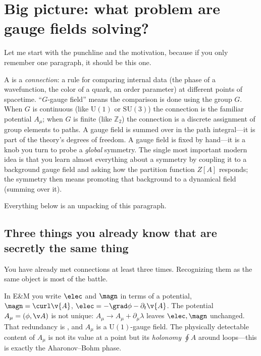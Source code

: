 \documentclass[11pt]{article}
\newcommand{\Uone}{\mathrm{U}(1)}
\newcommand{\Ztwo}{\mathbb{Z}_2}
\begin{document}
\section{Big picture: what problem are gauge fields solving?}

Let me start with the punchline and the motivation, because if you only remember one
paragraph, it should be this one.

\begin{iidea}
A  is a \emph{connection}: a rule for comparing internal data
(the phase of a wavefunction, the color of a quark, an order parameter) at different
points of spacetime. ``$G$-gauge field'' means the comparison is done using the group
$G$. When $G$ is continuous (like $\Uone$ or $\mathrm{SU}(3)$) the connection is the
familiar potential $A_\mu$; when $G$ is finite (like $\Ztwo$) the connection is a
discrete assignment of group elements to paths. A  gauge field is
summed over in the path integral---it is part of the theory's degrees of freedom. A
 gauge field is fixed by hand---it is a knob you turn to probe a
\emph{global} symmetry. The single most important modern idea is that you learn almost
everything about a symmetry by coupling it to a background gauge field and asking how
the partition function $Z[A]$ responds;  the symmetry then means
promoting that background to a dynamical field (summing over it).
\end{iidea}

Everything below is an unpacking of this paragraph.

\subsection{Three things you already know that are secretly the same thing}

You have already met connections at least three times. Recognizing them as the same
object is most of the battle.

\begin{eexample}
In E\&M you write $\elec$ and $\magn$ in terms of a potential,
$\magn = \curl \v{A}$, $\elec = -\grad \phi - \partial_t \v{A}$. The potential
$A_\mu = (\phi, \v A)$ is not unique: $A_\mu \to A_\mu + \partial_\mu\lambda$ leaves
$\elec,\magn$ unchanged. That redundancy is , and
$A_\mu$ is a $\Uone$-gauge field. The physically detectable content of $A_\mu$ is not
its value at a point but its \emph{holonomy} $\oint A$ around loops---this is exactly
the Aharonov--Bohm phase.
\end{eexample}
\end{document}
